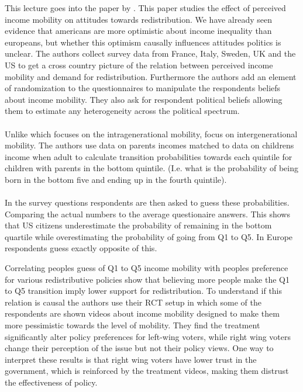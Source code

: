 This lecture goes into the paper by \cite{alesina_intergenerational_2018}. This paper studies the effect of perceived income mobility on attitudes towards redistribution. We have already seen evidence that americans are more optimistic about income inequality than europeans, but whether this optimism causally influences attitudes politics is unclear. The authors collect survey data from France, Italy, Sweden, UK and the US to get a cross country picture of the relation between perceived income mobility and demand for redistribution. Furthermore the authors add an element of randomization to the questionnaires to manipulate the respondents beliefs about income mobility. They also ask for respondent political beliefs allowing them to estimate any heterogeneity across the political spectrum. 
\\ \\
Unlike \cite{alesina_why_2001} which focuses on the intragenerational mobility, \cite{alesina_intergenerational_2018} focus on intergenerational mobility. The authors use data on parents incomes matched to data on childrens income when adult to calculate transition probabilities towards each quintile for children with parents in the bottom quintile. (I.e. what is the probability of being born in the bottom five and ending up in the fourth quintile). 
\\ \\
In the survey questions respondents are then asked to guess these probabilities. Comparing the actual numbers to the average questionaire answers. This shows that US citizens underestimate the probability of remaining in the bottom quartile while overestimating the probability of going from Q1 to Q5. In Europe respondents guess exactly opposite of this.

Correlating peoples guess of Q1 to Q5 income mobility with peoples preference for various redistributive policies show that believing more people make the Q1 to Q5 transition imply lower support for redistribution. To understand if this relation is causal the authors use their RCT setup in which some of the respondents are shown videos about income mobility designed to make them more pessimistic towards the level of mobility. They find the treatment significantly alter policy preferences for left-wing voters, while right wing voters change their perception of the issue but not their policy views. One way to interpret these results is that right wing voters have lower trust in the government, which is reinforced by the treatment videos, making them distrust the effectiveness of policy. 